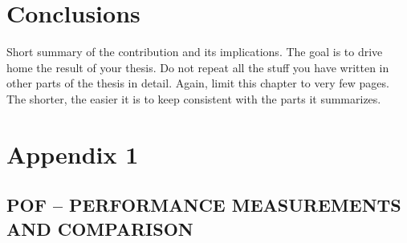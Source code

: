 \documentclass[12pt]{article}
\begin{document}
\section{Conclusions}
\label{sec:7}
Short summary of the contribution and its implications. The goal is to drive home the result of your thesis.
Do not repeat all the stuff you have written in other parts of the thesis in detail. Again, limit this chapter to very few pages. 
The shorter, the easier it is to keep consistent with the parts it summarizes.

\pagebreak








\pagebreak


\appendix

\section{Appendix 1}

\label{Appendix 1}

\subsection*{POF -- PERFORMANCE MEASUREMENTS AND COMPARISON}
\end{document}

